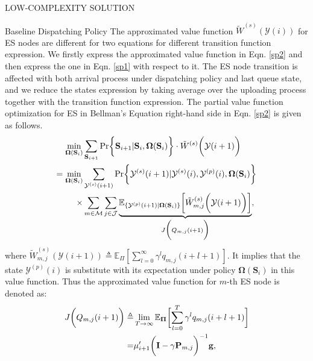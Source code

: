 \documentclass[10pt, conference, letterpaper]{IEEEtran}
\newcommand{\mat}{\mathbf}
\newcommand{\define}{\triangleq}
\renewcommand{\vec}{\mathbf}
\DeclarePairedDelimiter{\set}{\{}{\}}
\DeclarePairedDelimiter{\Paren}{\bigg(}{\bigg)}
\DeclarePairedDelimiter{\Bracket}{\bigg[}{\bigg]}
\DeclarePairedDelimiter{\Brace}{\bigg\{}{\bigg\}}
\newcommand{\esSet}{\mathcal{M}}
\newcommand{\jSpace}{\mathcal{J}}
\newcommand{\Stat}{\mathbf{S}}
\newcommand{\Obsv}{\mathcal{Y}}
\newcommand{\Policy}{\boldsymbol{\Omega}}
\newcommand{\BPolicy}{\Policy} %
\begin{document}
\begin{section}{LOW-COMPLEXITY SOLUTION}
\begin{subsection}{Baseline Dispatching Policy}
            The approximated value function $\tilde{W}^{(s)}(\Obsv(i))$ for ES nodes are different for two equations for different transition function expression.
            We firstly express the approximated value function in Eqn. \ref{sp2} and then express the one in Eqn. \ref{sp1} with respect to it.
            The ES node transition is affected with both arrival process under dispatching policy and last queue state, and we reduce the states expression by taking average over the uploading process together with the transition function expression.
            The partial value function optimization for ES in Bellman's Equation right-hand side in Eqn. \ref{sp2} is given as follows.
            \begin{align}
                \min_{\Policy(\Stat_i)}& \sum_{\Stat_{i+1}}
                    \Pr\Brace{\Stat_{i+1}|\Stat_{i}, \BPolicy(\Stat_i)} \cdot \tilde{W}^{(s)}\Paren{\Obsv(i+1)}
                \nonumber\\
                = \min_{\BPolicy(\Stat_i)}& \sum_{\Obsv^{(s)}(i+1)}
                    \Pr\Brace{\Obsv^{(s)}(i+1)|\Obsv^{(s)}(i), \Obsv^{(p)}(i), \BPolicy(\Stat_i)}
                    \nonumber\\
                    \times& \sum_{m\in\esSet} \sum_{j\in\jSpace}
                        \underbrace{
                            \mathbb{E}_{\set{\Obsv^{(p)}(i+1)|\BPolicy(\Stat_i)}} \Bracket{\tilde{W}^{(s)}_{m,j}\Paren{\Obsv(i+1)}}
                        }_{
                            J\Paren{Q_{m,j}(i+1)}
                        },
            \end{align}
            where $\tilde{W}^{(s)}_{m,j}(\Obsv(i+1)) \define \mathbb{E}_{\Pi}[\sum_{l=0}^{\infty} \gamma^{l} q_{m,j}(i+l+1)]$. It implies that the state $\Obsv^{(p)}(i)$ is substitute with its expectation under policy $\Policy(\Stat_i)$ in this value function.
            Thus the approximated value function for $m$-th ES node is denoted as:
            \begin{align}
                J\Paren{Q_{m,j}(i+1)} \define& \lim_{T\to\infty}
                    \mathbb{E}_{\vec{\Pi}} \Bracket{\sum_{l=0}^{T} \gamma^{l} q_{m,j}(i+l+1)}
                \nonumber\\
                =& \vec{\mu}'_{i+1} \Paren{ \mat{I}-\gamma\mat{P}_{m,j} }^{-1} \vec{g},
            \end{align}

\end{subsection}
\end{section}
\end{document}
